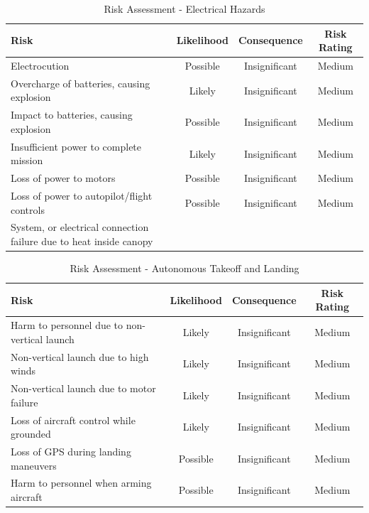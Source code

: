 \begin{table}[!ht]
	\label{tab:risks-electrical}
	\centering
	\begin{tabularx}{\textwidth}{|Y|c|c|c|}
		\hline
		\textbf{Risk} & \textbf{Likelihood} & \textbf{Consequence} & \textbf{Risk Rating}\\
		\hline
		Electrocution & Possible & Insignificant & Medium\\
		\hline
		Overcharge of batteries, causing explosion & Likely & Insignificant & Medium\\
		\hline
		Impact to batteries, causing explosion & Possible & Insignificant & Medium\\
		\hline
		Insufficient power to complete mission & Likely & Insignificant & Medium\\
		\hline
		Loss of power to motors & Possible & Insignificant & Medium\\		
		\hline
		Loss of power to autopilot/flight controls & Possible & Insignificant & Medium\\
		\hline
		System, or electrical connection failure due to heat inside canopy &  &  & \\
		\hline
	\end{tabularx} 
	\caption{Risk Assessment - Electrical Hazards}
\end{table}

\begin{table}[!ht]
	\label{tab:risks-autonomy}
	\centering
	\begin{tabularx}{\textwidth}{|Y|c|c|c|}
		\hline
		\textbf{Risk} & \textbf{Likelihood} & \textbf{Consequence} & \textbf{Risk Rating}\\
		\hline
		Harm to personnel due to non-vertical launch & Likely & Insignificant & Medium\\
		\hline
		Non-vertical launch due to high winds & Likely & Insignificant & Medium\\
		\hline
		Non-vertical launch due to motor failure & Likely & Insignificant & Medium\\
		\hline
		Loss of aircraft control while grounded & Likely & Insignificant & Medium\\
		\hline
		Loss of GPS during landing maneuvers & Possible & Insignificant & Medium\\
		\hline
		Harm to personnel when arming aircraft & Possible & Insignificant & Medium\\
		\hline
	\end{tabularx} 
	\caption{Risk Assessment - Autonomous Takeoff and Landing}
\end{table}

